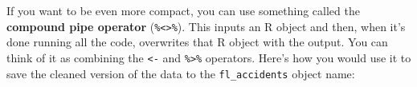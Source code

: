 \documentclass[]{tufte-book}
\newenvironment{Shaded}{}{}
\newcommand{\DataTypeTok}[1]{\textcolor[rgb]{0.56,0.13,0.00}{#1}}
\newcommand{\DecValTok}[1]{\textcolor[rgb]{0.25,0.63,0.44}{#1}}
\newcommand{\KeywordTok}[1]{\textcolor[rgb]{0.00,0.44,0.13}{\textbf{#1}}}
\newcommand{\NormalTok}[1]{#1}
\newcommand{\OperatorTok}[1]{\textcolor[rgb]{0.40,0.40,0.40}{#1}}
\newcommand{\StringTok}[1]{\textcolor[rgb]{0.25,0.44,0.63}{#1}}
\begin{document}
\begin{Shaded}
\end{Shaded}

If you want to be even more compact, you can use something called the \textbf{compound pipe operator}
(\texttt{\%\textless{}\textgreater{}\%}). This inputs an R object and then, when it's done running all the code, overwrites that
R object with the output. You can think of it as combining the \texttt{\textless{}-} and \texttt{\%\textgreater{}\%} operators. Here's
how you would use it to save the cleaned version of the data to the \texttt{fl\_accidents} object name:
\end{document}
